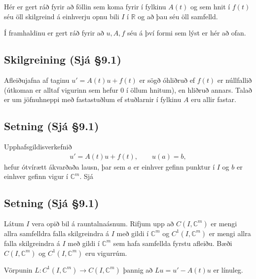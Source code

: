 \documentclass[a4paper,10pt,icelandic]{sphinxmanual}
\begin{document}
Hér er gert ráð fyrir að föllin sem koma fyrir í fylkinu \(A(t)\) og sem hnit í \(f(t)\) séu öll skilgreind á einhverju opnu bili \(I\) í \(\mathbb{R}\) og að þau séu öll samfelld.

Í framhaldinu er gert ráð fyrir að \(u, A, f\) séu á því formi sem lýst er hér að ofan.


\subsection{Skilgreining (Sjá \S{}9.1)}
\label{\detokenize{Kafli09:id2}}
Afleiðujafna af taginu \(u'=A(t)u+f(t)\) er sögð óhliðruð ef \(f(t)\) er núllfallið
(útkoman er alltaf vigurinn sem hefur 0 í öllum hnitum), en hliðruð annars. Talað er um jöfnuhneppi með fastastuðlum ef stuðlarnir í fylkinu \(A\) eru allir fastar.


\subsection{Setning (Sjá \S{}9.1)}
\label{\detokenize{Kafli09:setning-sja-9-1}}
Upphafsgildisverkefnið
\begin{equation*}
\begin{split}u'=A(t)u+f(t), \qquad u(a)=b,\label{5.1.2}\end{split}
\end{equation*}
hefur ótvírætt ákvarðaða lausn, þar sem \(a\) er einhver gefinn punktur í \(I\) og \(b\) er einhver gefinn vigur í \({\mathbb{C}}^m\). Sjá 


\subsection{Setning (Sjá \S{}9.1)}
\label{\detokenize{Kafli09:id3}}
Látum \(I\) vera opið bil á rauntalnaásnum. Rifjum upp að \(C(I, {\mathbb{C}}^m)\) er mengi allra samfelldra falla skilgreindra á \(I\) með gildi í \({\mathbb{C}}^m\) og \(C^1(I, {\mathbb{C}}^m)\) er mengi allra falla skilgreindra á \(I\) með gildi í \({\mathbb{C}}^m\) sem hafa samfellda fyrstu afleiðu. Bæði \(C(I, {\mathbb{C}}^m)\) og \(C^1(I, {\mathbb{C}}^m)\) eru vigurrúm.

Vörpunin \(L:C^1(I, {\mathbb{C}}^m)\to C(I, {\mathbb{C}}^m)\) þannig að \(Lu=u'-A(t)u\) er línuleg.
\end{document}
